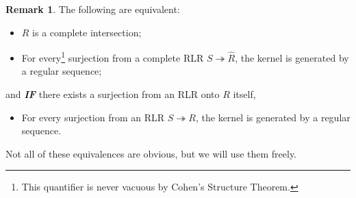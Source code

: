 \documentclass[11pt]{book}
\numberwithin{equation}{section}
\numberwithin{theorem}{chapter}
\theoremstyle{definition}
\newtheorem*{basic properties}{Basic Properties}
\newtheorem*{Important Remark}{Important Remark}
\newtheorem{remark}[theorem]{Remark}
\theoremstyle{remark}
\begin{document}
\begin{remark} The following are equivalent:
\begin{itemize}
	\item $R$ is a complete intersection;
	\item For every\footnote{This quantifier is never vacuous by Cohen's Structure Theorem.} surjection from a complete RLR $S \twoheadrightarrow \widehat{R}$, the kernel is generated by a regular sequence;
\end{itemize}
and \emph{\bf IF} there exists a surjection from an RLR onto $R$ itself,
\begin{itemize}
	\item For every surjection from an RLR $S \twoheadrightarrow {R}$, the kernel is generated by a regular sequence.
\end{itemize}
Not all of these equivalences are obvious, but we will use them freely.
\end{remark}
\end{document}
